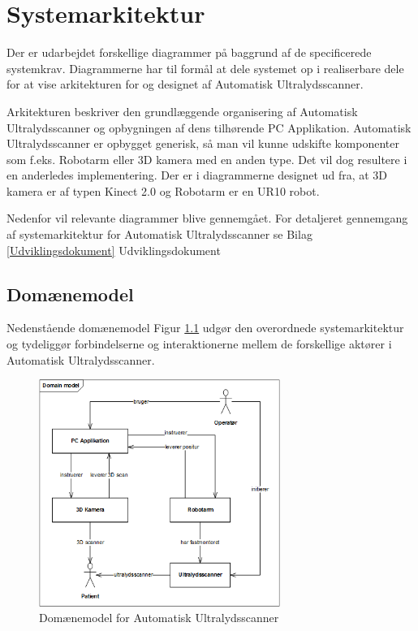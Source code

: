 \chapter{Systemarkitektur}\label{Systemarkitektur}
Der er udarbejdet forskellige diagrammer på baggrund af de specificerede systemkrav. Diagrammerne har til formål at dele systemet op i realiserbare dele for at vise arkitekturen for og designet af Automatisk Ultralydsscanner. 

Arkitekturen beskriver den grundlæggende organisering af Automatisk Ultralydsscanner og opbygningen af dens tilhørende PC Applikation. Automatisk Ultralydsscanner er opbygget generisk, så man vil kunne udskifte komponenter som f.eks. Robotarm eller 3D kamera med en anden type. Det vil dog resultere i en anderledes implementering. Der er i diagrammerne designet ud fra, at 3D kamera er af typen Kinect 2.0 og Robotarm er en UR10 robot. 

Nedenfor vil relevante diagrammer blive gennemgået. For detaljeret gennemgang af systemarkitektur for Automatisk Ultralydsscanner se Bilag  \ref{Udviklingsdokument} Udviklingsdokument

\section{Domænemodel}
Nedenstående domænemodel Figur \ref{domain} udgør den overordnede systemarkitektur og tydeliggør forbindelserne og interaktionerne mellem de forskellige aktører i Automatisk Ultralydsscanner. 

\begin{figure}[H]
    \centering
    \includegraphics[width=0.7\textwidth]{figurer/d/Design/uml_domain}
    \caption{Domænemodel for Automatisk Ultralydsscanner}
    \label{domain}
\end{figure}

